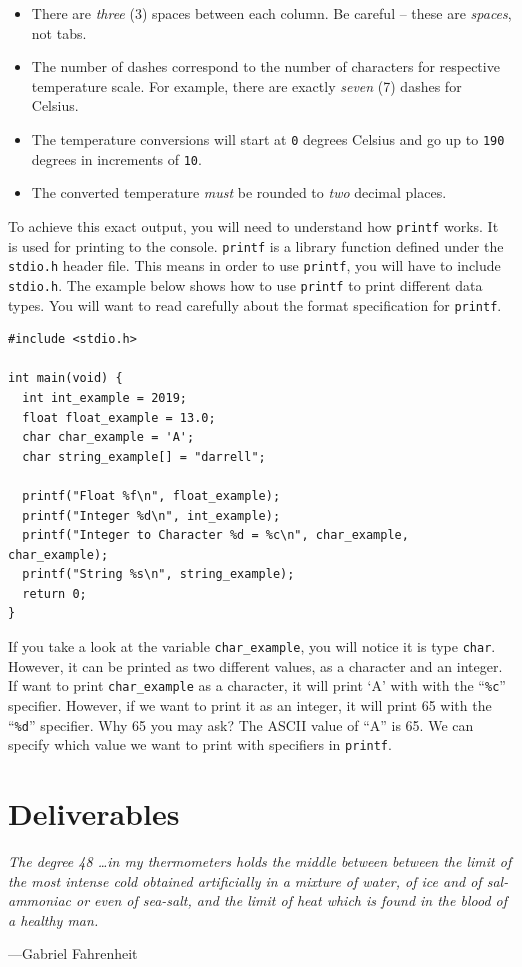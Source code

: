 \documentclass{article}
\begin{document}
\begin{itemize}
	\item There are \emph{three} (3) spaces between each column. Be careful -- these are \emph{spaces}, not tabs.
	\item The number of dashes correspond to the number of characters for respective temperature scale. For example, there are exactly \emph{seven} (7) dashes for Celsius.
	\item The temperature conversions will start at \texttt{0\degree} degrees Celsius and go up to \texttt{190\degree} degrees in increments of \texttt{10}.
	\item The converted temperature \emph{must} be rounded to \emph{two} decimal places.
\end{itemize}

To achieve this exact output, you will need to understand how \texttt{printf} works. It is used for printing to the console. \texttt{printf} is a library function defined under the \texttt{stdio.h} header file. This means in order to use \texttt{printf}, you will have to include \texttt{stdio.h}. The example below shows how to use \texttt{printf} to print different data types. You will want to read carefully about the format specification for \texttt{printf}.

\begin{lstlisting}
#include <stdio.h>

int main(void) {
  int int_example = 2019;
  float float_example = 13.0;
  char char_example = 'A';
  char string_example[] = "darrell";

  printf("Float %f\n", float_example);
  printf("Integer %d\n", int_example);
  printf("Integer to Character %d = %c\n", char_example, char_example);
  printf("String %s\n", string_example);
  return 0;
}
\end{lstlisting}
If you take a look at the variable \texttt{char\_example}, you will
notice it is type \texttt{char}. However, it can be printed as two
different values, as a character and an integer. If want to print
\texttt{char\_example} as a character, it will print `A' with with
the ``\texttt{\%c}'' specifier.  However, if we want to print it
as an integer, it will print 65 with the ``\texttt{\%d}'' specifier.
Why 65 you may ask? The ASCII value of ``A'' is 65. We can specify
which value we want to print with specifiers in \texttt{printf}.
\\



\section{Deliverables}
\epigraph{
\emph{The degree 48 \ldots in my thermometers holds the middle between between the limit of the most intense cold obtained artificially in a mixture of water, of ice and of sal-ammoniac or even of sea-salt, and the limit of heat which is found in the blood of a healthy man.}}{---Gabriel Fahrenheit}
\end{document}
